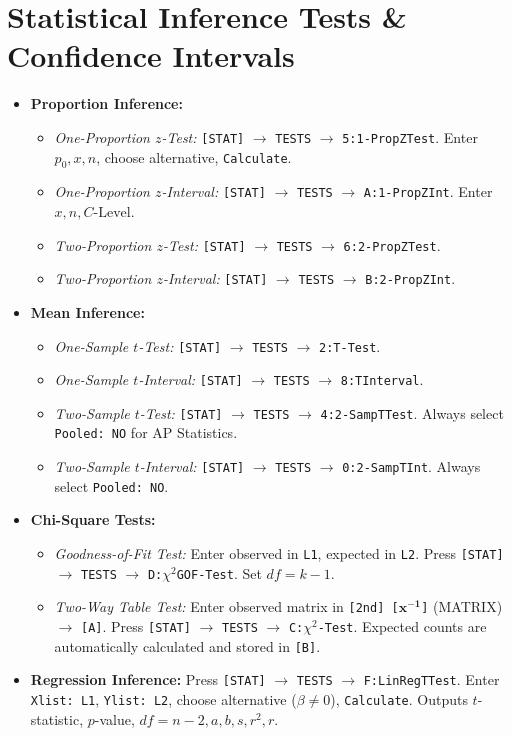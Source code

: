 \section{Statistical Inference Tests \& Confidence Intervals}
\begin{itemize}[leftmargin=1.5em]
  \item \textbf{Proportion Inference:}
  \begin{itemize}
    \item \textit{One-Proportion $z$-Test:} \texttt{[STAT]} $\to$ \texttt{TESTS} $\to$ \texttt{5:1-PropZTest}. Enter $p_0, x, n$, choose alternative, \texttt{Calculate}.
    \item \textit{One-Proportion $z$-Interval:} \texttt{[STAT]} $\to$ \texttt{TESTS} $\to$ \texttt{A:1-PropZInt}. Enter $x, n, C\text{-Level}$.
    \item \textit{Two-Proportion $z$-Test:} \texttt{[STAT]} $\to$ \texttt{TESTS} $\to$ \texttt{6:2-PropZTest}.
    \item \textit{Two-Proportion $z$-Interval:} \texttt{[STAT]} $\to$ \texttt{TESTS} $\to$ \texttt{B:2-PropZInt}.
  \end{itemize}
  \item \textbf{Mean Inference:}
  \begin{itemize}
    \item \textit{One-Sample $t$-Test:} \texttt{[STAT]} $\to$ \texttt{TESTS} $\to$ \texttt{2:T-Test}.
    \item \textit{One-Sample $t$-Interval:} \texttt{[STAT]} $\to$ \texttt{TESTS} $\to$ \texttt{8:TInterval}.
    \item \textit{Two-Sample $t$-Test:} \texttt{[STAT]} $\to$ \texttt{TESTS} $\to$ \texttt{4:2-SampTTest}. Always select \texttt{Pooled: NO} for AP Statistics.
    \item \textit{Two-Sample $t$-Interval:} \texttt{[STAT]} $\to$ \texttt{TESTS} $\to$ \texttt{0:2-SampTInt}. Always select \texttt{Pooled: NO}.
  \end{itemize}
  \item \textbf{Chi-Square Tests:}
  \begin{itemize}
    \item \textit{Goodness-of-Fit Test:} Enter observed in \texttt{L1}, expected in \texttt{L2}. Press \texttt{[STAT]} $\to$ \texttt{TESTS} $\to$ \texttt{D:$\chi^2$GOF-Test}. Set $df = k - 1$.
    \item \textit{Two-Way Table Test:} Enter observed matrix in \texttt{[2nd] [$\mathbf{x^{-1}}$]} (MATRIX) $\to$ \texttt{[A]}. Press \texttt{[STAT]} $\to$ \texttt{TESTS} $\to$ \texttt{C:$\chi^2$-Test}. Expected counts are automatically calculated and stored in \texttt{[B]}.
  \end{itemize}
  \item \textbf{Regression Inference:}
  Press \texttt{[STAT]} $\to$ \texttt{TESTS} $\to$ \texttt{F:LinRegTTest}. Enter \texttt{Xlist: L1}, \texttt{Ylist: L2}, choose alternative ($\beta \neq 0$), \texttt{Calculate}. Outputs $t$-statistic, $p$-value, $df = n - 2, a, b, s, r^2, r$.
\end{itemize}
